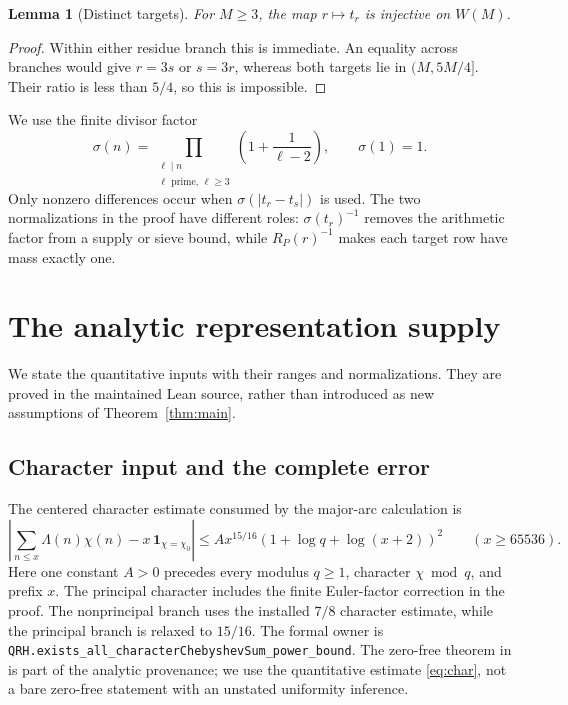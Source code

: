 \documentclass[11pt]{article}
\newtheorem{lemma}[theorem]{Lemma}
\theoremstyle{definition}
\theoremstyle{remark}
\newcommand{\sig}{\sigma}
\newcommand{\lean}[1]{\nolinkurl{#1}}
\begin{document}
\begin{lemma}[Distinct targets]\label{lem:injective}
For \(M\ge3\), the map \(r\mapsto t_r\) is injective on \(W(M)\).
\end{lemma}
\begin{proof}
Within either residue branch this is immediate. An equality across
branches would give \(r=3s\) or \(s=3r\), whereas both targets lie in
\((M,5M/4]\). Their ratio is less than \(5/4\), so this is impossible.
\end{proof}

We use the finite divisor factor
\begin{equation}\label{eq:sigma}
 \sig(n)=\prod_{\substack{\ell\mid n\\\ell\text{ prime},\,\ell\ge3}}
       \left(1+\frac1{\ell-2}\right),\qquad \sig(1)=1.
\end{equation}
Only nonzero differences occur when \(\sig(|t_r-t_s|)\) is used.
The two normalizations in the proof have different roles:
\(\sig(t_r)^{-1}\) removes the arithmetic factor from a supply or sieve
bound, while \(R_P(r)^{-1}\) makes each target row have mass exactly one.

\section{The analytic representation supply}\label{sec:source}

We state the quantitative inputs with their ranges and normalizations.
They are proved in the maintained Lean source, rather than introduced
as new assumptions of Theorem~\ref{thm:main}.

\subsection{Character input and the complete error}

The centered character estimate consumed by the major-arc calculation is
\begin{equation}\label{eq:char}
 \left|\sum_{n\le x}\Lambda(n)\chi(n)
       -x\,\mathbf1_{\chi=\chi_0}\right|
 \le A x^{15/16}
       (1+\log q+\log(x+2))^2
 \qquad(x\ge65536).
\end{equation}
Here one constant \(A>0\) precedes every modulus \(q\ge1\), character
\(\chi\bmod q\), and prefix \(x\). The principal character includes the
finite Euler-factor correction in the proof. The nonprincipal branch
uses the installed \(7/8\) character estimate, while the principal
branch is relaxed to \(15/16\). The formal owner is
\lean{QRH.exists_all_characterChebyshevSum_power_bound}.
The zero-free theorem in \cite{OAI} is part of the analytic provenance;
we use the quantitative estimate \eqref{eq:char}, not a bare
zero-free statement with an unstated uniformity inference.
\end{document}
